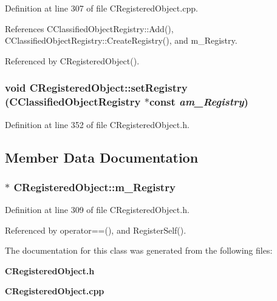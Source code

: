 Definition at line 307 of file CRegistered\-Object.cpp.

References CClassified\-Object\-Registry::Add(), CClassified\-Object\-Registry::Create\-Registry(), and m\_\-Registry.

Referenced by CRegistered\-Object().
\subsubsection{\setlength{\rightskip}{0pt plus 5cm}void CRegistered\-Object::set\-Registry ({\bf CClassified\-Object\-Registry} $\ast$const {\em am\_\-Registry})\hspace{0.3cm}{\tt  [inline, protected]}}\label{classCRegisteredObject_b0}




Definition at line 352 of file CRegistered\-Object.h.

\subsection{Member Data Documentation}
\subsubsection{$\ast$ CRegistered\-Object::m\_\-Registry\hspace{0.3cm}{\tt  [private]}}\label{classCRegisteredObject_o0}




Definition at line 309 of file CRegistered\-Object.h.

Referenced by operator==(), and Register\-Self().

The documentation for this class was generated from the following files:\begin{CompactItemize}
\item 
{\bf CRegistered\-Object.h}\item 
{\bf CRegistered\-Object.cpp}\end{CompactItemize}
